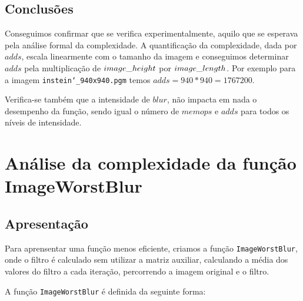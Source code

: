 \documentclass{report}
\begin{document}
\newpage

\subsection{Conclusões}

Conseguimos confirmar que se verifica experimentalmente, aquilo que se esperava pela análise formal da complexidade. 
A quantificação da complexidade, dada por \(adds\), escala linearmente com o tamanho da imagem e 
conseguimos determinar \(adds\) pela multiplicação de \(image\char`_height\) por \(image\char`_length\). 
Por exemplo para a imagem \texttt{instein\char`_940x940.pgm} temos \texttt{$adds = 940*940 = 1767200$}.
\par
Verifica-se também que a intensidade de \(blur\), não impacta em nada o desempenho da função, sendo igual o número de \(memops\) e \(adds\) 
para todos os níveis de intensidade.


\section{Análise da complexidade da função ImageWorstBlur}

\subsection{Apresentação}
Para aprensentar uma função menos eficiente, criamos a função \texttt{ImageWorstBlur}, onde o filtro é calculado sem utilizar a matriz auxiliar,
calculando a média dos valores do filtro a cada iteração, percorrendo a imagem original e o filtro.
\par
A função \texttt{ImageWorstBlur} é definida da seguinte forma:
\end{document}
